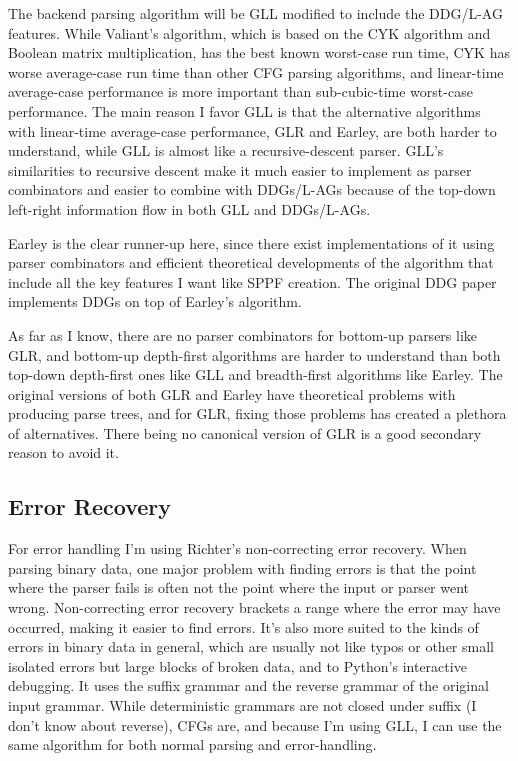 \documentclass[12pt]{article}
\begin{document}
The backend parsing algorithm will be GLL modified to include the
DDG/L-AG features.  While Valiant's algorithm, which is based on the
CYK algorithm and Boolean matrix multiplication, has the best known
worst-case run time, CYK has worse average-case run time than other
CFG parsing algorithms, and linear-time average-case performance is
more important than sub-cubic-time worst-case performance.  The main
reason I favor GLL is that the alternative algorithms with linear-time
average-case performance, GLR and Earley, are both harder to
understand, while GLL is almost like a recursive-descent parser.
GLL's similarities to recursive descent make it much easier to
implement as parser combinators and easier to combine with DDGs/L-AGs
because of the top-down left-right information flow in both GLL and
DDGs/L-AGs.

Earley is the clear runner-up here, since there exist implementations
of it using parser combinators and efficient theoretical developments
of the algorithm that include all the key features I want like SPPF
creation.  The original DDG paper \textcite{yakker1} implements DDGs
on top of Earley's algorithm.

As far as I know, there are no parser combinators for bottom-up
parsers like GLR, and bottom-up depth-first algorithms are harder to
understand than both top-down depth-first ones like GLL and
breadth-first algorithms like Earley.  The original versions of both
GLR and Earley have theoretical problems with producing parse trees,
and for GLR, fixing those problems has created a plethora of
alternatives.  There being no canonical version of GLR is a good
secondary reason to avoid it.


\subsection{Error Recovery}
\label{sec:errors}

For error handling I'm using Richter's non-correcting error recovery.
When parsing binary data, one major problem with finding errors is
that the point where the parser fails is often not the point where the
input or parser went wrong.  Non-correcting error recovery brackets a
range where the error may have occurred, making it easier to find
errors.  It's also more suited to the kinds of errors in binary data
in general, which are usually not like typos or other small isolated
errors but large blocks of broken data, and to Python's interactive
debugging.  It uses the suffix grammar and the reverse grammar of the
original input grammar.  While deterministic grammars are not closed
under suffix (I don't know about reverse), CFGs are, and because I'm
using GLL, I can use the same algorithm for both normal parsing and
error-handling.
\end{document}
